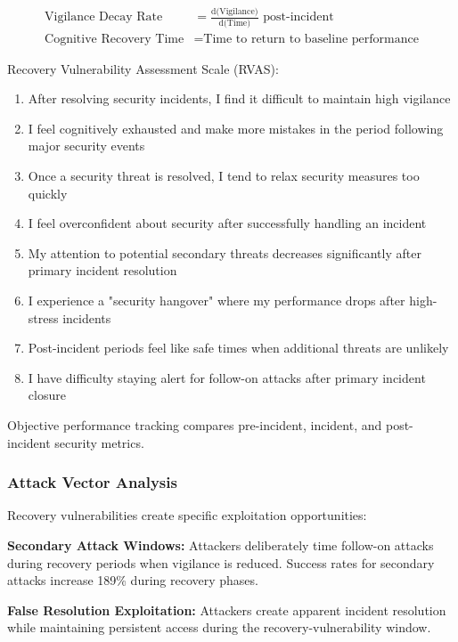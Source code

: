 \documentclass[11pt,a4paper]{article}
\begin{document}
\begin{align}
\text{Vigilance Decay Rate} &= \frac{\text{d(Vigilance)}}{\text{d(Time)}} \text{ post-incident} \\
\text{Cognitive Recovery Time} &= \text{Time to return to baseline performance}
\end{align}

Recovery Vulnerability Assessment Scale (RVAS):

\begin{enumerate}
\item After resolving security incidents, I find it difficult to maintain high vigilance
\item I feel cognitively exhausted and make more mistakes in the period following major security events
\item Once a security threat is resolved, I tend to relax security measures too quickly
\item I feel overconfident about security after successfully handling an incident
\item My attention to potential secondary threats decreases significantly after primary incident resolution
\item I experience a "security hangover" where my performance drops after high-stress incidents
\item Post-incident periods feel like safe times when additional threats are unlikely
\item I have difficulty staying alert for follow-on attacks after primary incident closure
\end{enumerate}

Objective performance tracking compares pre-incident, incident, and post-incident security metrics.

\subsubsection{Attack Vector Analysis}

Recovery vulnerabilities create specific exploitation opportunities:

\textbf{Secondary Attack Windows:} Attackers deliberately time follow-on attacks during recovery periods when vigilance is reduced. Success rates for secondary attacks increase 189\% during recovery phases\cite{secondary2022}.

\textbf{False Resolution Exploitation:} Attackers create apparent incident resolution while maintaining persistent access during the recovery-vulnerability window\cite{false2023}.
\end{document}
